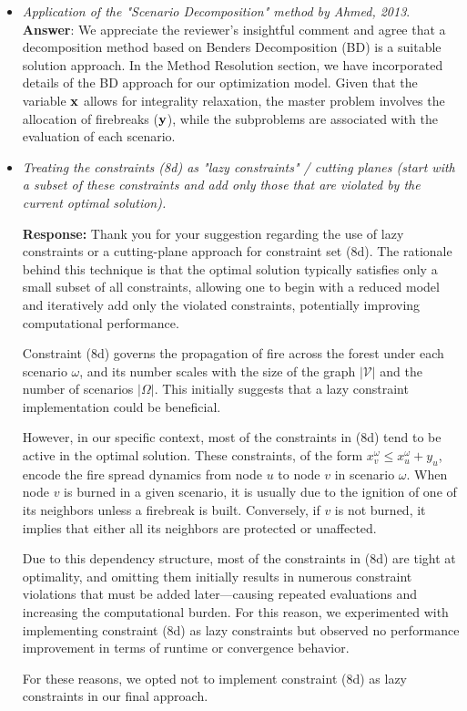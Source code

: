 \documentclass[12pt]{article}
\begin{document}
\begin{itemize}
    \item \textit{Application of the "Scenario Decomposition" method by Ahmed, 2013}.\\
    
    \textbf{Answer}: We appreciate the reviewer's insightful comment and agree that a decomposition method based on Benders Decomposition (BD) is a suitable solution approach. In the Method Resolution section, we have incorporated details of the BD approach for our optimization model. Given that the variable $\bf{x}$ allows for integrality relaxation, the master problem involves the allocation of firebreaks ($\bf{y}$), while the subproblems are associated with the evaluation of each scenario.

    \item \textit{Treating the constraints (8d) as "lazy constraints" / cutting planes (start with a subset of these constraints and add only those that are violated by the current optimal solution).}

    \textbf{Response:} Thank you for your suggestion regarding the use of lazy constraints or a cutting-plane approach for constraint set (8d). The rationale behind this technique is that the optimal solution typically satisfies only a small subset of all constraints, allowing one to begin with a reduced model and iteratively add only the violated constraints, potentially improving computational performance.
    
    Constraint (8d) governs the propagation of fire across the forest under each scenario $\omega$,  and its number scales with the size of the graph $|\mathcal{V}|$ and the number of scenarios $|\Omega|$. This initially suggests that a lazy constraint implementation could be beneficial.
    
    However, in our specific context, most of the constraints in (8d) tend to be active in the optimal solution. These constraints, of the form $x_v^\omega \leq x_u^\omega + y_u$, encode the fire spread dynamics from node $u$ to node $v$ in scenario $\omega$. When node $v$ is burned in a given scenario, it is usually due to the ignition of one of its neighbors unless a firebreak is built. Conversely, if $v$ is not burned, it implies that either all its neighbors are protected or unaffected.

    Due to this dependency structure, most of the constraints in (8d) are tight at optimality, and omitting them initially results in numerous constraint violations that must be added later—causing repeated evaluations and increasing the computational burden. For this reason, we experimented with implementing constraint (8d) as lazy constraints but observed no performance improvement in terms of runtime or convergence behavior.

    For these reasons, we opted not to implement constraint (8d) as lazy constraints in our final approach.
  

\end{itemize}
\end{document}

